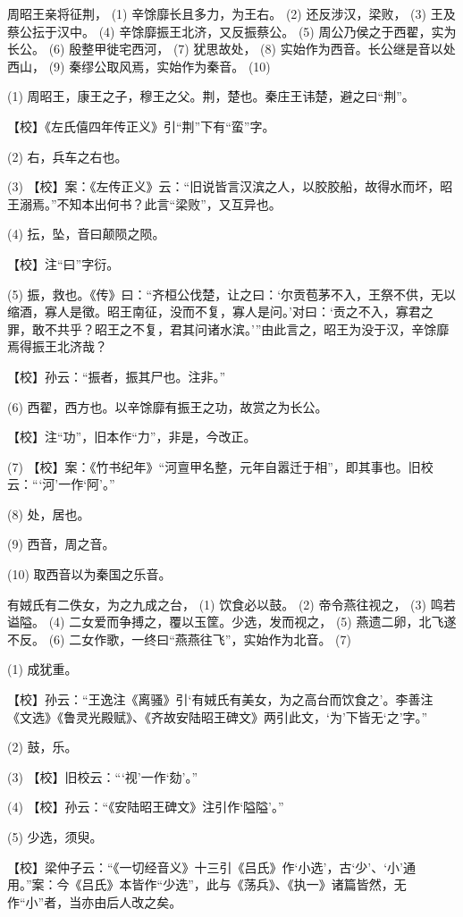 \documentclass[12pt,UTF8]{ctexbook}
\begin{document}
周昭王亲将征荆， (1) 辛馀靡长且多力，为王右。 (2) 还反涉汉，梁败， (3) 王及蔡公抎于汉中。 (4) 辛馀靡振王北济，又反振蔡公。 (5) 周公乃侯之于西翟，实为长公。 (6) 殷整甲徙宅西河， (7) 犹思故处， (8) 实始作为西音。长公继是音以处西山， (9) 秦缪公取风焉，实始作为秦音。 (10)

(1) 周昭王，康王之子，穆王之父。荆，楚也。秦庄王讳楚，避之曰“荆”。

【校】《左氏僖四年传正义》引“荆”下有“蛮”字。

(2) 右，兵车之右也。

(3) 【校】案：《左传正义》云：“旧说皆言汉滨之人，以胶胶船，故得水而坏，昭王溺焉。”不知本出何书？此言“梁败”，又互异也。

(4) 抎，坠，音曰颠陨之陨。

【校】注“曰”字衍。

(5) 振，救也。《传》曰：“齐桓公伐楚，让之曰：‘尔贡苞茅不入，王祭不供，无以缩酒，寡人是徵。昭王南征，没而不复，寡人是问。’对曰：‘贡之不入，寡君之罪，敢不共乎？昭王之不复，君其问诸水滨。’”由此言之，昭王为没于汉，辛馀靡焉得振王北济哉？

【校】孙云：“振者，振其尸也。注非。”

(6) 西翟，西方也。以辛馀靡有振王之功，故赏之为长公。

【校】注“功”，旧本作“力”，非是，今改正。

(7) 【校】案：《竹书纪年》“河亶甲名整，元年自嚣迁于相”，即其事也。旧校云：“‘河’一作‘阿’。”

(8) 处，居也。

(9) 西音，周之音。

(10) 取西音以为秦国之乐音。

有娀氏有二佚女，为之九成之台， (1) 饮食必以鼓。 (2) 帝令燕往视之， (3) 鸣若谥隘。 (4) 二女爱而争搏之，覆以玉筐。少选，发而视之， (5) 燕遗二卵，北飞遂不反。 (6) 二女作歌，一终曰“燕燕往飞”，实始作为北音。 (7)

(1) 成犹重。

【校】孙云：“王逸注《离骚》引‘有娀氏有美女，为之高台而饮食之’。李善注《文选》《鲁灵光殿赋》、《齐故安陆昭王碑文》两引此文，‘为’下皆无‘之’字。”

(2) 鼓，乐。

(3) 【校】旧校云：“‘视’一作‘劾’。”

(4) 【校】孙云：“《安陆昭王碑文》注引作‘隘隘’。”

(5) 少选，须臾。

【校】梁仲子云：“《一切经音义》十三引《吕氏》作‘小选’，古‘少’、‘小’通用。”案：今《吕氏》本皆作“少选”，此与《荡兵》、《执一》诸篇皆然，无作“小”者，当亦由后人改之矣。
\end{document}
